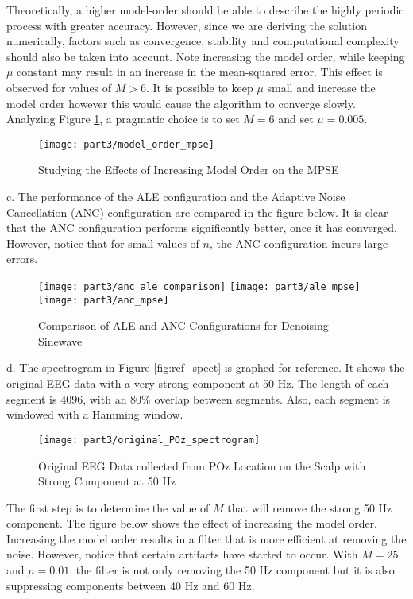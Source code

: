 \noindent{}Theoretically, a higher model-order should be able to describe the highly periodic process with greater accuracy. However, since we are deriving the solution numerically, factors such as convergence, stability and computational complexity should also be taken into account. Note increasing the model order, while keeping $\mu$ constant may result in an increase in the mean-squared error. This effect is observed for values of $M>6$. It is possible to keep $\mu$ small and increase the model order however this would cause the algorithm to converge slowly. Analyzing Figure \ref{fig:ale_model}, a pragmatic choice is to set $M=6$ and set $\mu=0.005$.

\begin{figure}[H]
\centering{}
\texttt{[image: part3/model\_order\_mpse]}
\caption{Studying the Effects of Increasing Model Order on the MPSE}
\label{fig:ale_model}
\end{figure}

\noindent{}c. The performance of the ALE configuration and the Adaptive Noise Cancellation (ANC) configuration are compared in the figure below. It is clear that the ANC configuration performs significantly better, once it has converged. However, notice that for small values of $n$, the ANC configuration incurs large errors.

\begin{figure}[H]
\centering{}
\texttt{[image: part3/anc\_ale\_comparison]}
\texttt{[image: part3/ale\_mpse]}
\texttt{[image: part3/anc\_mpse]}
\caption{Comparison of ALE and ANC Configurations for Denoising Sinewave}
\end{figure}

\noindent{}d. The spectrogram in Figure \ref{fig:ref_spect} is graphed for reference. It shows the original EEG data with a very strong component at 50 Hz. The length of each segment is $4096$, with an $80\%$ overlap between segments. Also, each segment is windowed with a Hamming window. 

\begin{figure}[H]
\centering{}
\texttt{[image: part3/original\_POz\_spectrogram]}
\caption{Original EEG Data collected from POz Location on the Scalp with Strong Component at 50 Hz}
\label{eq:ref_spect}
\end{figure}

\noindent{}The first step is to determine the value of $M$ that will remove the strong 50 Hz component. The figure below shows the effect of increasing the model order. Increasing the model order results in a filter that is more efficient at removing the noise. However, notice that certain artifacts have started to occur. With $M=25$ and $\mu=0.01$, the filter is not only removing the 50 Hz component but it is also suppressing components between 40 Hz and 60 Hz.

